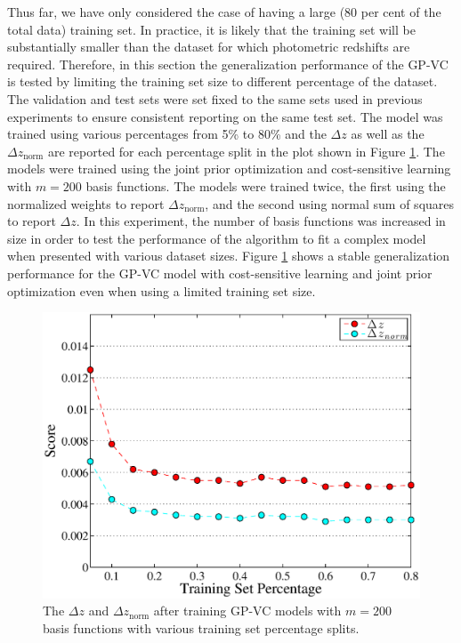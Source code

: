 \documentclass[useAMS,usenatbib,fleqn]{mn2e}
\begin{document}
Thus far, we have only considered the case of having a large (80 per cent of the total data) training set. In practice, it is likely that the training set will be substantially smaller than the dataset for which photometric redshifts are required. Therefore, in this section the generalization performance of the GP-VC is tested by limiting the training set size to different percentage of the dataset. The validation and test sets were set fixed to the same sets used in previous experiments to ensure consistent reporting on the same test set. The model was trained using various percentages from 5\% to 80\% and the $\Delta z$ as well as the $\Delta z_\textrm{norm}$ are reported for each percentage split in the plot shown in Figure \ref{fig-training-percentage}. The models were trained using the joint prior optimization and cost-sensitive learning with $m=200$ basis functions. The models were trained twice, the first using the normalized weights to report $\Delta z_\textrm{norm}$, and the second using normal sum of squares to report $\Delta z$. In this experiment, the number of basis functions was increased in size in order to test the performance of the algorithm to fit a complex model when presented with various dataset sizes. Figure \ref{fig-training-percentage} shows a stable generalization performance for the GP-VC model with cost-sensitive learning and joint prior optimization even when using a limited training set size. 

\begin{figure}
       \centering
        \includegraphics[width=\columnwidth]{figures/percentage.eps}
        \caption{The $\Delta z$ and $\Delta z_\textrm{norm}$ after training GP-VC models with $m=200$ basis functions with various training set percentage splits. }
       \label{fig-training-percentage}
\end{figure}
\end{document}
